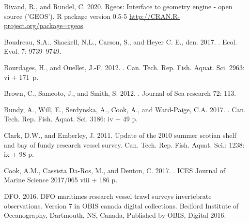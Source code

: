 \documentclass[12pt]{article}\usepackage[]{graphicx}\usepackage[]{color}
\begin{document}
\begin{CSLReferences}{1}{0}
\leavevmode\hypertarget{ref-R:package:rgeos}{}%
Bivand, R., and Rundel, C. 2020. Rgeos: Interface to geometry engine - open source ('GEOS'). R package version 0.5-5 \url{http://CRAN.R-project.org/package=rgeos}.

\leavevmode\hypertarget{ref-Boudreau:2017}{}%
Boudreau, S.A., Shackell, N.L., Carson, S., and Heyer C. E., den. 2017. . Ecol. Evol. 7: 9739--9749.

\leavevmode\hypertarget{ref-Bourdages:NGatlas:2012}{}%
Bourdages, H., and Ouellet, J.-F. 2012. . Can. Tech. Rep. Fish. Aquat. Sci. 2963: vi + 171~p.

\leavevmode\hypertarget{ref-Brown:2012}{}%
Brown, C., Sameoto, J., and Smith, S. 2012. . Journal of Sea research 72: 113.

\leavevmode\hypertarget{ref-Bundyetal2017}{}%
Bundy, A., Will, E., Serdynska, A., Cook, A., and Ward-Paige, C.A. 2017. . Can. Tech. Rep. Fish. Aquat. Sci. 3186: iv + 49 p.

\leavevmode\hypertarget{ref-ClarkEmberley2011}{}%
Clark, D.W., and Emberley, J. 2011. Update of the 2010 summer scotian shelf and bay of fundy research vessel survey. Can. Tech. Rep. Fish. Aquat. Sci.: 1238: ix + 98 p.

\leavevmode\hypertarget{ref-Cook:2017}{}%
Cook, A.M., Cassista Da-Ros, M., and Denton, C. 2017. . ICES Journal of Marine Science 2017/065 viii + 186 p.

\leavevmode\hypertarget{ref-DFO:2016}{}%
DFO. 2016. DFO maritimes research vessel trawl surveys invertebrate observations. Version 7 in OBIS canada digital collections. Bedford Institute of Oceanography, Dartmouth, NS, Canada, Published by OBIS, Digital 2016.


\end{CSLReferences}
\end{document}
